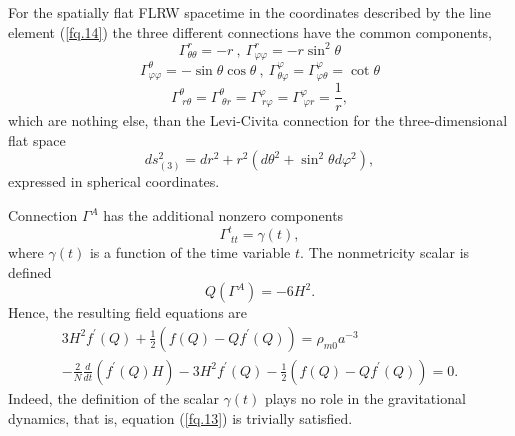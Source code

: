 \documentclass[onecolumn,superscriptaddress,secnumarabic,nobibnotes,aps,prd,nofootinbib,altaffilletter,11pt]{revtex4}
\begin{document}
For the spatially flat FLRW spacetime in the coordinates described by the
line element (\ref{fq.14}) the three different connections have the common
components, 
\begin{equation*}
\Gamma _{\theta \theta }^{r}=-r~,~\Gamma _{\varphi \varphi }^{r}=-r\sin
^{2}\theta
\end{equation*}%
\begin{equation*}
\Gamma _{\varphi \varphi }^{\theta }=-\sin \theta \cos \theta ~,~\Gamma
_{\theta \varphi }^{\varphi }=\Gamma _{\varphi \theta }^{\varphi }=\cot
\theta
\end{equation*}%
\begin{equation*}
\Gamma _{\;r\theta }^{\theta }=\Gamma _{\;\theta r}^{\theta }=\Gamma
_{\;r\varphi }^{\varphi }=\Gamma _{\;\varphi r}^{\varphi }=\frac{1}{r},
\end{equation*}%
which are nothing else, than the Levi-Civita connection for the
three-dimensional flat space 
\begin{equation}
ds_{\left( 3\right) }^{2}=dr^{2}+r^{2}\left( d\theta ^{2}+\sin ^{2}\theta
d\varphi ^{2}\right) ,
\end{equation}%
expressed in spherical coordinates.

Connection $\Gamma ^{A}$ has the additional nonzero components%
\begin{equation}
\Gamma _{\;tt}^{t}=\gamma (t),  \label{con1}
\end{equation}%
where $\gamma (t)$ is a function of the time variable $t$. The nonmetricity
scalar is defined \cite{he1,he2,he3}%
\begin{equation*}
Q\left( \Gamma ^{A}\right) =-6H^{2}\text{.}
\end{equation*}%
Hence, the resulting field
equations are%
\begin{gather}
3H^{2}f^{\prime }(Q)+\frac{1}{2}\left( f(Q)-Qf^{\prime }(Q)\right) =\rho
_{m0}a^{-3} \\
-\frac{2}{N}\frac{d}{dt}\left( f^{\prime }\left( Q\right) H\right)
-3H^{2}f^{\prime }(Q)-\frac{1}{2}\left( f(Q)-Qf^{\prime }(Q)\right) =0.
\end{gather}%
Indeed, the definition of the scalar $\gamma \left( t\right) $ plays no role
in the gravitational dynamics, that is, equation (\ref{fq.13}) is trivially
satisfied.
\end{document}
